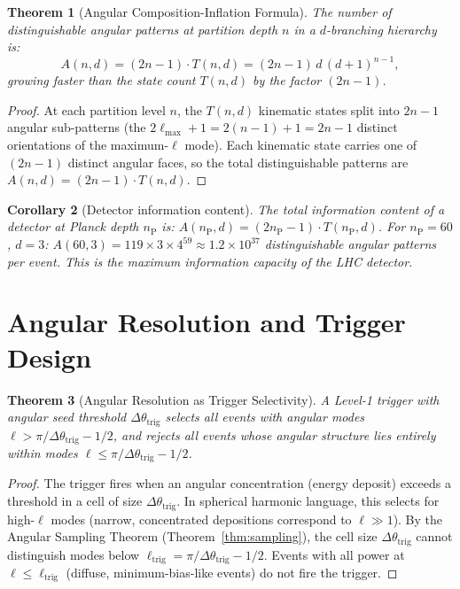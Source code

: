 \documentclass[twocolumn,10pt,a4paper]{article}
\theoremstyle{thmstyle}
\newtheorem{theorem}{Theorem}[section]
\newtheorem{corollary}[theorem]{Corollary}
\theoremstyle{definition}
\theoremstyle{remark}
\newcommand{\nP}{n_{\mathrm{P}}}
\begin{document}
\begin{theorem}[Angular Composition-Inflation Formula]
\label{thm:angular_inflation}
The number of distinguishable angular patterns at partition depth $n$
in a $d$-branching hierarchy is:
\begin{equation}
A(n,d) = (2n-1)\cdot T(n,d) = (2n-1)\,d\,(d+1)^{n-1},
\label{eq:angular_inflation}
\end{equation}
growing faster than the state count $T(n,d)$ by the factor $(2n-1)$.
\end{theorem}

\begin{proof}
At each partition level $n$, the $T(n,d)$ kinematic states split into
$2n-1$ angular sub-patterns (the $2\ell_{\max}+1 = 2(n-1)+1 = 2n-1$
distinct orientations of the maximum-$\ell$ mode).
Each kinematic state carries one of $(2n-1)$ distinct angular faces,
so the total distinguishable patterns are $A(n,d) = (2n-1)\cdot T(n,d)$.
\end{proof}

\begin{corollary}[Detector information content]
The total information content of a detector at Planck depth $\nP$ is:
$A(\nP, d) = (2\nP-1)\cdot T(\nP,d)$.
For $\nP = 60$, $d = 3$: $A(60,3) = 119 \times 3 \times 4^{59}
\approx 1.2 \times 10^{37}$ distinguishable angular patterns per event.
This is the maximum information capacity of the LHC detector.
\end{corollary}

\section{Angular Resolution and Trigger Design}
\label{sec:trigger}

\begin{theorem}[Angular Resolution as Trigger Selectivity]
\label{thm:trigger_angular}
A Level-1 trigger with angular seed threshold $\Delta\theta_{\mathrm{trig}}$
selects all events with angular modes $\ell > \pi/\Delta\theta_{\mathrm{trig}}
- 1/2$, and rejects all events whose angular structure lies entirely
within modes $\ell \leq \pi/\Delta\theta_{\mathrm{trig}} - 1/2$.
\end{theorem}

\begin{proof}
The trigger fires when an angular concentration (energy deposit) exceeds
a threshold in a cell of size $\Delta\theta_{\mathrm{trig}}$. In spherical
harmonic language, this selects for high-$\ell$ modes
(narrow, concentrated depositions correspond to $\ell \gg 1$).
By the Angular Sampling Theorem (Theorem~\ref{thm:sampling}), the cell
size $\Delta\theta_{\mathrm{trig}}$ cannot distinguish modes below
$\ell_{\mathrm{trig}} = \pi/\Delta\theta_{\mathrm{trig}} - 1/2$.
Events with all power at $\ell \leq \ell_{\mathrm{trig}}$ (diffuse,
minimum-bias-like events) do not fire the trigger.
\end{proof}
\end{document}
